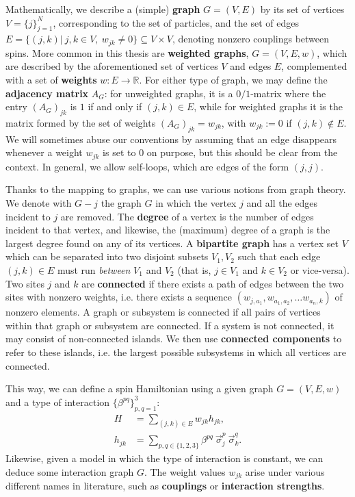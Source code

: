 Mathematically, we describe a (simple) \textbf{graph} $G = (V,E)$ by its set of vertices $V = \{ j \}_{j=1}^{N}$, corresponding to the set of particles, and the set of edges $E = \{ (j,k) |  \ j,k \in V, \ w_{jk} \neq 0 \}  \subseteq V \times V$, denoting nonzero couplings between spins. More common in this thesis are \textbf{weighted graphs}, $G = (V,E,w)$, which are described by the aforementioned set of vertices $V$ and edges $E$, complemented with a set of \textbf{weights} $w: E \rightarrow \mathbb{R}$. For either type of graph, we may define the \textbf{adjacency matrix} $A_G$: for unweighted graphs, it is a $0/1$-matrix where the entry $(A_G)_{jk}$ is $1$ if and only if $(j,k) \in E$, while for weighted graphs it is the matrix formed by the set of weights $(A_G)_{jk} = w_{jk}$, with $w_{jk} := 0$ if $(j,k) \not \in E$. 
We will sometimes abuse our conventions by assuming that an edge disappears whenever a weight $w_{jk}$ is set to $0$ on purpose, but this should be clear from the context. In general, we allow self-loops, which are edges of the form $(j,j)$. 


Thanks to the mapping to graphs, we can use various notions from graph theory. We denote with $G-j$ the graph $G$ in which the vertex $j$ and all the edges incident to $j$ are removed. The \textbf{degree} of a vertex is the number of edges incident to that vertex, and likewise, the (maximum) degree of a graph is the largest degree found on any of its vertices. A \textbf{bipartite graph} has a vertex set $V$ which can be separated into two disjoint subsets $V_1, V_2$ such that each edge $(j,k) \in E$ must run \emph{between} $V_1$ and $V_2$ (that is, $j \in V_1$ and $k \in V_2$ or vice-versa). 
Two sites $j$ and $k$ are \textbf{connected} if there exists a path of edges between the two sites with nonzero weights, i.e. there exists a sequence $(w_{j,a_1}, w_{a_1,a_2}, \ldots w_{a_n, k})$ of nonzero elements. A graph or subsystem is connected if all pairs of vertices within that graph or subsystem are connected. If a system is not connected, it may consist of non-connected islands. We then use \textbf{connected components} to refer to these islands, i.e. the largest possible subsystems in which all vertices are connected. 

This way, we can define a spin Hamiltonian using a given graph $G=(V,E,w)$ and a type of interaction $\{ \beta^{pq}\}_{p,q = 1}^3$: 
\begin{align}
H &= \sum_{(j,k) \in E} w_{jk} h_{jk},  \label{eqn:hamfromgraph} \\
h_{jk} &= \sum_{p, q \in \{1,2,3\} } \beta^{pq} \ \vec{\sigma}^p_j \ \vec{\sigma}^q_k. \nonumber
\end{align}
Likewise, given a model in which the type of interaction is constant, we can deduce some interaction graph $G$. The weight values $w_{jk}$ arise under various different names in literature, such as \textbf{couplings} or \textbf{interaction strengths}.

